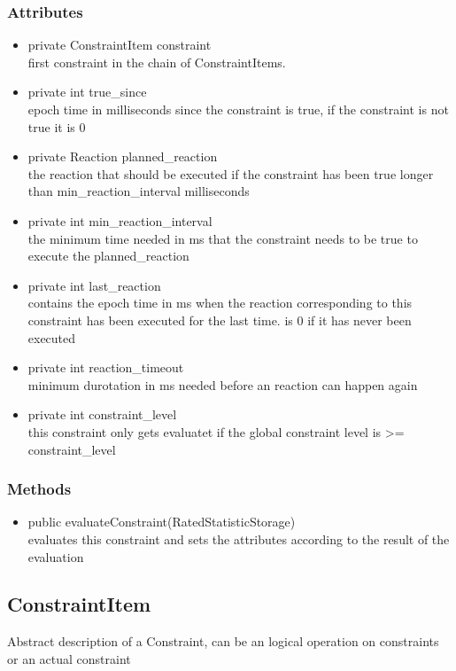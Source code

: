 \subsubsection{Attributes}
\begin{itemize}
	\item private  ConstraintItem constraint\\
	first constraint in the chain of ConstraintItems.
	\item private  int true\_since\\
	epoch time in milliseconds since the constraint is true,
	if the constraint is not true it is 0
	\item private  Reaction planned\_reaction\\
	the reaction that should be executed if the constraint has been true longer than min\_reaction\_interval milliseconds
	\item private  int min\_reaction\_interval\\
	the minimum time needed in ms that the constraint needs to be true to execute the planned\_reaction
	\item private  int last\_reaction\\
	contains the epoch time in ms when the reaction corresponding to this constraint has been executed for the last time.
		is 0 if it has never been executed
	\item private  int reaction\_timeout\\
	minimum durotation in ms needed before an reaction can happen again
	\item private  int constraint\_level\\
	this constraint only gets evaluatet if the global constraint level is >= constraint\_level
\end{itemize}
\subsubsection{Methods}
\begin{itemize}
	\item public evaluateConstraint(RatedStatisticStorage) \\
	evaluates this constraint and sets the attributes according to the result of the evaluation
\end{itemize}



\subsection{ConstraintItem}
	Abstract description of a Constraint, can be an logical operation on constraints or an actual constraint
